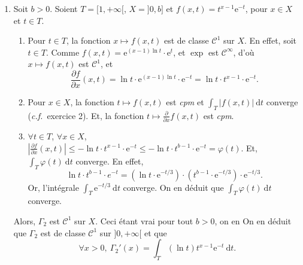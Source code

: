 \begin{exo}
\begin{enumerate}[label=\textit{(\alph*)}]
\begin{enumerate}[label=\arabic*.]
			\end{enumerate}
			Alors, $\Gamma_1$\/ est $\mathcal{C}^1$ sur $X$. Ceci étant vrai pour tout $a > 0$, on en
			On en déduit que $\Gamma_1$\/ est de classe $\mathcal{C}^1$ sur $]0,+\infty[$\/ et que \[
				\forall x > 0,\: \Gamma_1'(x) = \int_{T} (\ln t) t^{x - 1} \mathrm{e}^{-t}~\mathrm{d}t
			.\]
		\item Soit $b > 0$. Soient $T = {[1,+\infty[}$, $X = {]0,b]}$\/ et $f(x,t) = t^{x-1} \mathrm{e}^{-t}$, pour $x \in X$\/ et $t \in T$.
			\begin{enumerate}[label=\arabic*.]
				\item Pour $t \in T$, la fonction $x \mapsto f(x,t)$\/ est de classe $\mathcal{C}^1$\/ sur $X$. En effet, soit $t \in T$. Comme $f(x,t) = \mathrm{e}^{(x-1)\ln t} \cdot \mathrm{e}^{t}$, et $\exp$\/ est $\mathcal{C}^\infty$, d'où $x \mapsto f(x,t)$\/ est $\mathcal{C}^1$, et \[
						\frac{\partial f}{\partial x}(x,t) = \ln t \cdot \mathrm{e}^{(x-1) \ln t} \cdot \mathrm{e}^{-t} = \ln t \cdot t^{x-1} \cdot \mathrm{e}^{-t}
					.\]
				\item Pour $x \in X$, la fonction $t \mapsto f(x,t)$\/ est \textit{cpm} et $\int_{T} \big|f(x,t)\big|~\mathrm{d}t$\/ converge (\textit{c.f.}\ exercice 2). Et, la fonction $t \mapsto \frac{\partial}{\partial x} f(x,t)$\/ est \textit{cpm}.
				\item $\forall t \in T$, $\forall x \in X$, $\left| \frac{\partial f}{\partial x} (x,t) \right| \le -\ln t \cdot t^{x-1} \cdot \mathrm{e}^{-t} \le - \ln t \cdot  t^{b - 1} \cdot \mathrm{e}^{-t}  = \varphi(t)$. Et, $\int_{T} \varphi(t)~\mathrm{d}t$\/ converge. En effet, \[
						\ln t \cdot t^{b-1} \cdot e^{-t} = (\ln t \cdot \mathrm{e}^{-t / 3}) \cdot (t^{b - 1}\cdot \mathrm{e}^{-t/3}) \cdot \mathrm{e}^{-t / 3}
					.\]
					Or, l'intégrale $\int_{T}\mathrm{e}^{-t / 3}~\mathrm{d}t$\/ converge. On en déduit que $\int_{T} \varphi(t)~\mathrm{d}t$\/ converge.
			\end{enumerate}
			Alors, $\Gamma_2$\/ est $\mathcal{C}^1$ sur $X$. Ceci étant vrai pour tout $b > 0$, on en
			On en déduit que $\Gamma_2$\/ est de classe $\mathcal{C}^1$ sur $]0,+\infty[$\/ et que \[
				\forall x > 0,\: \Gamma_2'(x) = \int_{T} (\ln t) t^{x - 1} \mathrm{e}^{-t}~\mathrm{d}t
			.\]
	\end{enumerate}
\end{exo}

